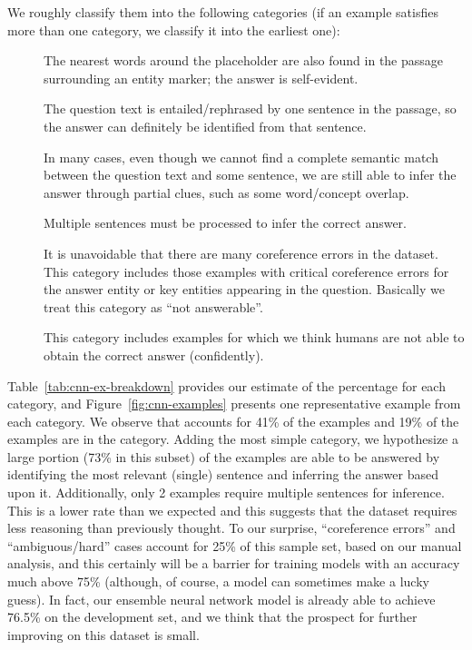 We roughly classify them into the following categories (if an example satisfies more than one category, we classify it into the earliest one):
\begin{description}
   \item[] The nearest words around the placeholder are also found in the passage surrounding an entity marker; the answer is self-evident.
   \item[] The question text is entailed\slash rephrased by  one sentence in the passage, so the answer can definitely be identified from that sentence.
   \item[] In many cases, even though we cannot find a complete semantic match between the question text and some sentence, we are still able to infer the answer through partial clues, such as some word/concept overlap.
   \item[] Multiple sentences must be processed to infer the correct answer.
   \item[] It is unavoidable that there are many coreference errors in the dataset. This category includes those examples with critical coreference errors for the answer entity or key entities appearing in the question. Basically we treat this category as ``not answerable''.
   \item[] This category includes examples for which we think humans are not able to obtain the correct answer (confidently).
\end{description}

Table~\ref{tab:cnn-ex-breakdown} provides our estimate of the percentage for each category, and Figure~\ref{fig:cnn-examples} presents one representative example from each category. We observe that  accounts for 41\% of the examples and 19\% of the examples are in the  category. Adding the most simple  category, we hypothesize a large portion (73\% in this subset) of the examples are able to be answered by identifying the most relevant (single) sentence and inferring the answer based upon it. Additionally, only 2 examples require multiple sentences for inference. This is a lower rate than we expected and this suggests that the dataset requires less reasoning than previously thought. To our surprise, “coreference errors” and “ambiguous/hard” cases account for 25\% of this sample set, based on our manual analysis, and this certainly will be a barrier for training models with an accuracy much above 75\% (although, of course, a model can sometimes make a lucky guess). In fact, our ensemble neural network model is already able to achieve 76.5\% on the development set, and we think that the prospect for further improving on this dataset is small.

